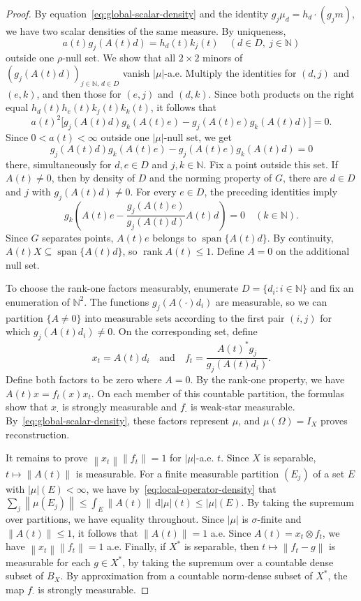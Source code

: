 \documentclass[11pt,leqno]{amsart}
\theoremstyle{compact}
\numberwithin{equation}{section}
\theoremstyle{compactremark}
\theoremstyle{compact}
\DeclareMathOperator{\spn}{span}
\newcommand{\1}{\mathbbm{1}}
\newcommand{\rmd}{\mathrm{d}}
\newcommand{\N}{\mathbb{N}}
\newcommand{\norm}[1]{\left\|#1\right\|}
\newcommand{\abs}[1]{\left|#1\right|}
\begin{document}
\begin{proof}
By equation~\eqref{eq:global-scalar-density} and the identity $g_j\mu_d=h_d\cdot(g_jm)$, we have two scalar densities of the same measure. By uniqueness,
\[
a(t)g_j(A(t)d)=h_d(t)k_j(t)\quad(d\in D,\ j\in\N)
\]
outside one $\rho$-null set. We show that all $2\times2$ minors of $(g_j(A(t)d))_{j\in\N,\,d\in D}$ vanish $\abs{\mu}$-a.e. Multiply the identities for $(d,j)$ and $(e,k)$, and then those for $(e,j)$ and $(d,k)$. Since both products on the right equal $h_d(t)h_e(t)k_j(t)k_k(t)$, it follows that
\[
a(t)^2\big[g_j(A(t)d)g_k(A(t)e)-g_j(A(t)e)g_k(A(t)d)\big]=0.
\]
Since $0<a(t)<\infty$ outside one $\abs{\mu}$-null set, we get
\[
g_j(A(t)d)g_k(A(t)e)-g_j(A(t)e)g_k(A(t)d)=0
\]
there, simultaneously for $d,e\in D$ and $j,k\in\N$. Fix a point outside this set. If $A(t)\neq0$, then by density of $D$ and the norming property of $G$, there are $d\in D$ and $j$ with $g_j(A(t)d)\neq0$. For every $e\in D$, the preceding identities imply
\[
g_k\left(A(t)e-\frac{g_j(A(t)e)}{g_j(A(t)d)}A(t)d\right)=0
\quad(k\in\N).
\]
Since $G$ separates points, $A(t)e$ belongs to $\spn\{A(t)d\}$. By continuity, $A(t)X\subseteq\spn\{A(t)d\}$, so $\operatorname{rank}A(t)\leq1$. Define $A=0$ on the additional null set.

To choose the rank-one factors measurably, enumerate $D=\{d_i:i\in\N\}$ and fix an enumeration of $\N^2$. The functions $g_j(A(\cdot)d_i)$ are measurable, so we can partition $\{A\neq0\}$ into measurable sets according to the first pair $(i,j)$ for which $g_j(A(t)d_i)\neq0$. On the corresponding set, define
\[
x_t=A(t)d_i\quad\text{and}\quad f_t=\frac{A(t)^*g_j}{g_j(A(t)d_i)}.
\]
Define both factors to be zero where $A=0$. By the rank-one property, we have $A(t)x=f_t(x)x_t$. On each member of this countable partition, the formulas show that $x_\cdot$ is strongly measurable and $f_\cdot$ is weak-star measurable. By~\eqref{eq:global-scalar-density}, these factors represent $\mu$, and $\mu(\Omega)=I_X$ proves reconstruction.

It remains to prove $\norm{x_t}\norm{f_t}=1$ for $\abs{\mu}$-a.e. $t$. Since $X$ is separable, $t\mapsto\norm{A(t)}$ is measurable. For a finite measurable partition $(E_j)$ of a set $E$ with $\abs{\mu}(E)<\infty$, we have by~\eqref{eq:local-operator-density} that $ \sum_j\norm{\mu(E_j)} \leq\int_E\norm{A(t)}\,\rmd\abs{\mu}(t)\leq \abs{\mu}(E) $. By taking the supremum over partitions, we have equality throughout. Since $\abs{\mu}$ is $\sigma$-finite and $\norm{A(t)}\leq1$, it follows that $\norm{A(t)}=1$ a.e. Since $A(t)=x_t\otimes f_t$, we have $\norm{x_t}\norm{f_t}=1$ a.e. Finally, if $X^*$ is separable, then $t\mapsto\norm{f_t-g}$ is measurable for each $g\in X^*$, by taking the supremum over a countable dense subset of $B_X$. By approximation from a countable norm-dense subset of $X^*$, the map $f_\cdot$ is strongly measurable.
\end{proof}
\end{document}
